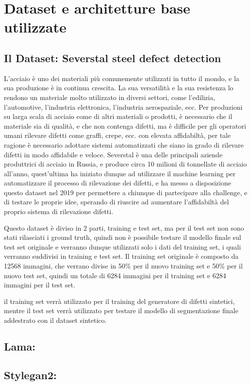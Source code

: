 \chapter{Dataset e architetture base utilizzate\ok \ok \ok}

\section{Il Dataset: Severstal steel defect detection \ok}
\begin{comment}
dataset utilizzato per il progetto
\end{comment}
L'acciaio è uno dei materiali più comunemente utilizzati in tutto il mondo, e la sua produzione è in continua crescita.
La sua versatilità e la sua resistenza lo rendono un materiale molto utilizzato in diversi settori, come l'edilizia, l'automotive, l'industria elettronica, l'industria aerospaziale, ecc.
Per produzioni su larga scala di acciaio come di altri materiali o prodotti, è necessario che il materiale sia di qualità, e che non contenga difetti,
ma è difficile per gli operatori umani rilevare difetti come graffi, crepe, ecc. con elevata affidabiltà, per tale ragione 
è necessario adottare sistemi automatizzati che siano in grado di rilevare difetti in modo affidabile e veloce.
Severstal è una delle principali aziende produttrici di acciaio in Russia, e produce circa 10 milioni di tonnellate di acciaio all'anno,
quest'ultima ha iniziato dunque ad utilizzare il machine learning per automatizzare il processo di rilevazione dei difetti, e ha messo a disposizione
questo dataset nel 2019 per permettere a chiunque di partecipare alla challenge, e di testare le proprie idee, sperando di riuscire ad aumentare l'affidabiltà
del proprio sistema di rilevazione difetti.

Questo dataset è diviso in 2 parti, training e test set, ma per il test set non sono stati rilasciati i ground truth, quindi non è possibile testare
il modello finale sul test set originale e verranno dunque utilizzati solo i dati del training set, i quali verranno suddivisi in training e test set.
Il training set originale  è composto da 12568 immagini, che verrano divise in 50\% per il nuovo training set e 50\% per il nuovo test set, 
quindi un totale di 6284 immagini per il training set e 6284 immagini per il test set.

il training set verrà utilizzato per il training del generatore di difetti sintetici, mentre il test set verrà utilizzato per testare 
il modello di segmentazione finale addestrato con il dataset sintetico.


\section{Lama:  \ok}
\begin{comment}
Architettura base utilizzata per il modello.
\end{comment}


\section{Stylegan2:  \ok}
\begin{comment}
Architettura usata per generare le maskere sintetiche
e come componente del modello finale.
\end{comment}

